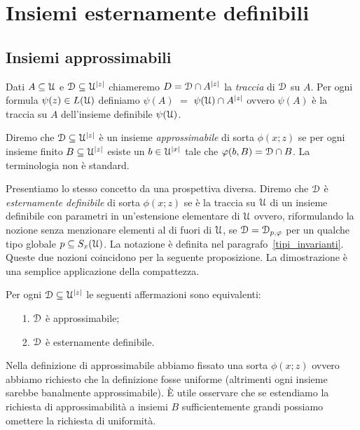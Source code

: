 \chapter{Insiemi esternamente definibili}
\label{esterni}

\lavori

\section{Insiemi approssimabili}

Dati $A\subseteq\EuScript U$ e $\EuScript D\subseteq\EuScript U^{|z|}$ chiameremo $D=\EuScript D\cap A^{|z|}$ la \emph{traccia\/} di $\EuScript D$ su $A$. Per ogni formula $\psi(z)\in L(\EuScript U)$ definiamo \emph{$\psi(A)$\/} $=$ $\psi(\EuScript U)\cap A^{|z|}$ ovvero $\psi(A)$ \`e la traccia su $A$ dell'insieme definibile $\psi(\EuScript U)$. 

Diremo che $\EuScript D\subseteq\EuScript U^{|z|}$ \`e un insieme \emph{approssimabile\/} di sorta $\phi(x;z)$ se per ogni insieme finito $B\subseteq\EuScript U^{|z|}$ esiste un $b\in\EuScript U^{|x|}$ tale che $\varphi(b,B)=\EuScript D\cap B$. La terminologia non \`e standard.

Presentiamo lo stesso concetto da una prospettiva diversa. Diremo che $\EuScript D$ \`e \emph{esternamente definibile\/} di sorta $\phi(x;z)$ se \`e la traccia su $\EuScript U$ di un insieme definibile con parametri in un'estensione elementare di $\EuScript U$ ovvero, riformulando la nozione senza menzionare elementi al di fuori di $\EuScript U$, se $\EuScript D=\EuScript D_{p,\varphi}$ per un qualche tipo globale $p\subseteq S_x(\EuScript U)$. La notazione \`e definita nel paragrafo~\ref{tipi_invarianti}. Queste due nozioni coincidono per la seguente proposizione. La dimostrazione \`e una semplice applicazione della compattezza. 

\begin{proposition}\label{lem_approx=external}
Per ogni $\EuScript D\subseteq\EuScript U^{|z|}$ le seguenti affermazioni sono equivalenti:
\begin{itemize}
\item[1.] $\EuScript D$ \`e approssimabile;
\item[2.] $\EuScript D$ \`e esternamente definibile.\QED 
\end{itemize}
\end{proposition}

Nella definizione di approssimabile abbiamo fissato una sorta $\phi(x;z)$ ovvero abbiamo richiesto che la definizione fosse uniforme (altrimenti ogni insieme sarebbe banalmente approssimabile). \`E utile osservare che se estendiamo la richiesta di approssimabilit\`a a insiemi $B$ sufficientemente grandi possiamo omettere la richiesta di uniformit\`a.

